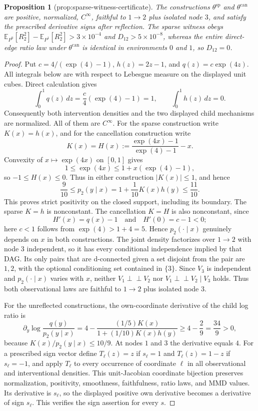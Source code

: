 \documentclass{article}
\newtheorem{proposition}{Proposition}
\begin{document}
\begin{proposition}[prop:sparse-witness-certificate]\label{prop:sparse-witness-certificate}
The constructions \(\theta^{\mathrm{sp}}\) and \(\theta^{\mathrm{can}}\) are positive, normalized, \(C^\infty\), faithful to \(1\to2\) plus isolated node \(3\), and satisfy the prescribed derivative signs after reflection. The sparse witness obeys \(\mathbb E_{P^0}[R_2^2]-\mathbb E_{P^1}[R_2^2]>3\times10^{-4}\) and \(D_{12}>5\times10^{-8}\), whereas the entire direct-edge ratio law under \(\theta^{\mathrm{can}}\) is identical in environments \(0\) and \(1\), so \(D_{12}=0\).
\end{proposition}
\begin{proof}
Put \(c=4/(\exp(4)-1)\), \(h(z)=2z-1\), and \(q(z)=c\exp(4z)\).  All integrals below are with respect to Lebesgue measure on the displayed unit cubes.  Direct calculation gives
\[
 \int_0^1q(z)\,dz=\frac{c}{4}(\exp(4)-1)=1,
 \qquad
 \int_0^1h(z)\,dz=0.
\]
Consequently both intervention densities and the two displayed child mechanisms are normalized.  All of them are \(C^\infty\).  For the sparse construction write \(K(x)=h(x)\), and for the cancellation construction write
\[
 K(x)=H(x):=\frac{\exp(4x)-1}{\exp(4)-1}-x.
\]
Convexity of \(x\mapsto\exp(4x)\) on \([0,1]\) gives
\[
 1\leq \exp(4x)\leq 1+x(\exp(4)-1),
\]
so \(-1\leq H(x)\leq0\).  Thus in either construction \(|K(x)|\leq1\), and hence
\[
 \frac9{10}\leq p_2(y\mid x)=1+\frac1{10}K(x)h(y)\leq\frac{11}{10}.
\]
This proves strict positivity on the closed support, including its boundary.  The sparse \(K=h\) is nonconstant.  The cancellation \(K=H\) is also nonconstant, since
\[
 H'(x)=q(x)-1
 \quad\text{and}\quad
 H'(0)=c-1<0;
\]
here \(c<1\) follows from \(\exp(4)>1+4=5\).  Hence \(p_2(\cdot\mid x)\) genuinely depends on \(x\) in both constructions.  The joint density factorizes over \(1\to2\) with node \(3\) independent, so it has every conditional independence implied by that DAG.  Its only pairs that are d-connected given a set disjoint from the pair are \(1,2\), with the optional conditioning set contained in \(\{3\}\).  Since \(V_3\) is independent and \(p_2(\cdot\mid x)\) varies with \(x\), neither \(V_1\mathbin{\perp\!\!\!\perp}V_2\) nor \(V_1\mathbin{\perp\!\!\!\perp}V_2\mid V_3\) holds.  Thus both observational laws are faithful to \(1\to2\) plus isolated node \(3\).

For the unreflected constructions, the own-coordinate derivative of the child log ratio is
\[
 \partial_y\log\frac{q(y)}{p_2(y\mid x)}
 =4-\frac{(1/5)K(x)}{1+(1/10)K(x)h(y)}
 \geq 4-\frac{2}{9}=\frac{34}{9}>0,
\]
because \(K(x)/p_2(y\mid x)\leq10/9\).  At nodes \(1\) and \(3\) the derivative equals \(4\).  For a prescribed sign vector define \(T_\ell(z)=z\) if \(s_\ell=1\) and \(T_\ell(z)=1-z\) if \(s_\ell=-1\), and apply \(T_\ell\) to every occurrence of coordinate \(\ell\) in all observational and interventional densities.  This unit-Jacobian coordinate bijection preserves normalization, positivity, smoothness, faithfulness, ratio laws, and MMD values.  Its derivative is \(s_\ell\), so the displayed positive own derivative becomes a derivative of sign \(s_\ell\).  This verifies the sign assertion for every \(s\).


\end{proof}
\end{document}
